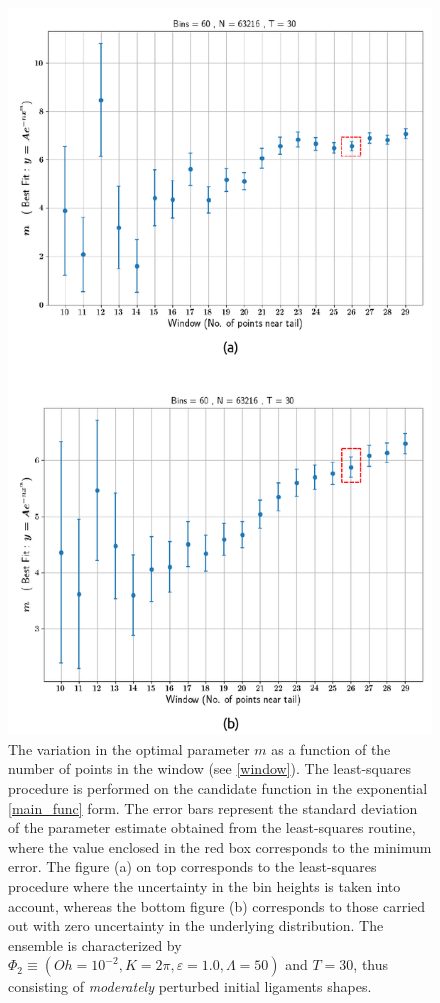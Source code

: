 \begin{figure}
\centering
	\includegraphics{plots/drop_stats/determine_fit_linear.pdf}
\caption{
	The variation in the optimal parameter $m$ as a 
	function of the number of points in the window (see \ref{window}).
	The least-squares procedure is performed on the 
	candidate function in the exponential \eqref{main_func} form.
	The error bars represent the standard deviation of the 
	parameter estimate obtained from the least-squares routine,
	where the value enclosed in the red box corresponds to the minimum error.
	The figure (a) on top corresponds to the least-squares procedure where the 
	uncertainty in the bin heights is taken into account, whereas the bottom
	figure (b) corresponds to those carried out with zero uncertainty in the underlying distribution. 
	The ensemble is characterized by $\Phi_2 \equiv \left( Oh = 10^{-2}, K = 2\pi 
	, \varepsilon = 1.0 , \Lambda = 50 \right)$ and $T = 30$, 
	thus consisting of \textit{moderately} perturbed initial ligaments shapes. 
	}
\label{determine_linear}
\end{figure}


